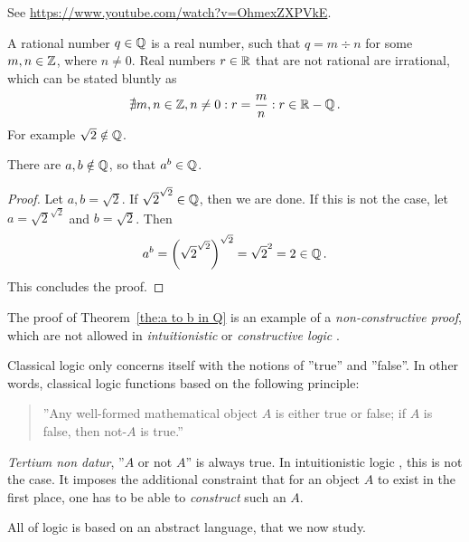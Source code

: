 \begin{example}
    See \url{https://www.youtube.com/watch?v=OhmexZXPVkE}.
\end{example}

\begin{example}
    A rational number \(q\in\Qset\) is a real number,
    such that \(q = m\div n\) for some \(m,n\in\Zset\), where \(n\neq 0\).
    Real numbers \(r\in\Rset\) that are not rational are irrational,
    which can be stated bluntly as
    \begin{equation*}
        \nexists m, n \in \Zset, n\neq 0 : r = \frac m n : r \in \Rset - \Qset\,.
    \end{equation*}
    For example \(\sqrt 2\notin\Qset\).
\end{example}

\begin{theorem}\label{the:a to b in Q}
    There are \(a,b\notin\Qset\), so that \(a^b\in\Qset\).
\end{theorem}

\begin{proof}
    Let \(a, b = \sqrt 2\). If \(\sqrt 2 ^{\sqrt 2} \in\Qset\), then we are done.
    If this is not the case, let \(a = \sqrt2^{\sqrt 2}\) and \(b = \sqrt 2\).
    Then
    \begin{equation*}
        a^b = \arcs*{\sqrt2^{\sqrt 2}}^{\sqrt 2} = \sqrt 2 ^ 2 = 2 \in\Qset\,.
    \end{equation*}
    This concludes the proof.
\end{proof}

The proof of Theorem~\ref{the:a to b in Q} is an example of a \emph{non-constructive proof},
which are not allowed in \emph{intuitionistic} or \emph{constructive logic} \LJ.

Classical logic \LK{} only concerns itself with the notions of ''true'' and ''false''.
In other words, classical logic functions based on the following principle:
\begin{quote}
    ''Any well-formed mathematical object \(A\) is either true or false;
    if \(A\) is false, then not-\(A\) is true.''
\end{quote}
\emph{Tertium non datur}, ''\(A\) or not \(A\)'' is always true.
In intuitionistic logic \LJ, this is not the case.
It imposes the additional constraint that for an object \(A\)
to exist in the first place, one has to be able to \emph{construct}
such an \(A\).

All of logic is based on an abstract language, that we now study.
